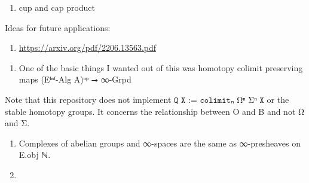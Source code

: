 \documentclass{book}
\theoremstyle{definition}
\newcounter{pcounter}
\newcounter{sectioncount}
\newcounter{subsectioncount}
\renewcommand{\section}[1]{\newpage\ \\ \ \\ \begin{center} \scalebox{1.5}{\texttt{\thesectioncount . #1}} \stepcounter{sectioncount} \setcounter{subsectioncount}{1} \end{center} \begin{center} \ \\ \ \\ \thispagestyle{empty} \end{center}}
\begin{document}
\begin{enumerate}
\item cup and cap product
\end{enumerate}

Ideas for future applications:

\begin{enumerate}
\item \url{https://arxiv.org/pdf/2206.13563.pdf}
\end{enumerate}

\begin{enumerate}
\item One of the basic things I wanted out of this was homotopy colimit preserving maps (Eⁱⁿᶠ-Alg A)ᵒᵖ ⭢ ∞-Grpd
\end{enumerate}

Note that this repository does not implement $\texttt{Q X := colimitₙ Ωⁿ Σⁿ X}$ or the stable homotopy groups. It concerns the relationship between O and B and not Ω and Σ.\\

\begin{enumerate}
\item Complexes of abelian groups and ∞-spaces are the same as ∞-presheaves on E.obj ℕ.
\item 
\end{enumerate}

\section{Contents}
\end{document}
